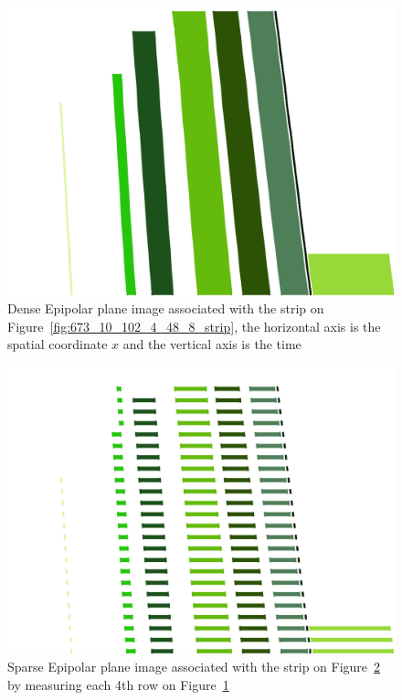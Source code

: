 \begin{figure}[h!]
\centering
\includegraphics[width = 0.6 \textwidth]{./EPIs_Strips/EPIs/673_10_102_4_48_8_dense.png}
\caption{Dense Epipolar plane image associated with the strip on Figure~\ref{fig:673_10_102_4_48_8_strip}, the horizontal axis is the spatial coordinate $x$ and the vertical axis is the time}
\label{fig:673_10_102_4_48_8_dense}
\end{figure}

\begin{figure}[h!]
\centering
\includegraphics[width = 0.6 \textwidth]{./EPIs_Strips/EPIs/673_10_102_4_48_8_sparse.png}
\caption{Sparse Epipolar plane image associated with the strip on Figure~\ref{fig:673_10_102_4_48_8_sparse} by measuring each 4th row on Figure~\ref{fig:673_10_102_4_48_8_dense}}
\label{fig:673_10_102_4_48_8_sparse}
\end{figure}

